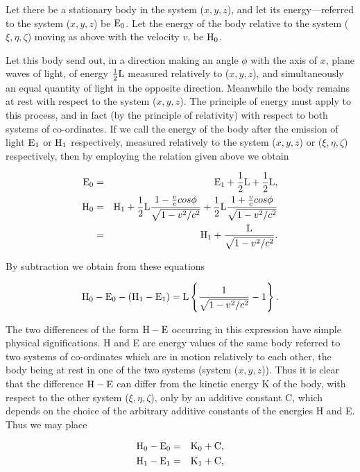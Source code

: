 \documentclass[11pt]{article}
\begin{document}
Let there be a stationary body in the system ($x,y,z$),
and let its energy---referred to the system ($x,y,z$) be ${\rm E}_0$.
Let the energy of the body relative to the system ($\xi,\eta,\zeta$)
moving as above with the velocity $v$, be ${\rm H}_0$.

Let this body send out, in a direction making an angle $\phi$
with the axis of $x$, plane waves of light, of energy
$\frac{1}{2}{\rm L}$ measured relatively to ($x,y,z$), and
simultaneously an equal quantity of light in the opposite
direction.  Meanwhile the body remains at rest with respect to
the system ($x,y,z$).  The principle of energy must apply to
this process, and in fact (by the principle of relativity) with
respect to both systems of co-ordinates.  If we call the energy
of the body after the emission of light ${\rm E}_1$ or
${\rm H}_1$ respectively, measured relatively to the system
($x,y,z$) or ($\xi,\eta,\zeta$) respectively, then by employing
the relation given above we obtain

\begin{eqnarray*}
    {\rm E}_0 & = & {\rm E}_1 + \frac{1}{2}{\rm L} + \frac{1}{2}{\rm L}, \\
    {\rm H}_0 & = & {\rm H}_1 + \frac{1}{2}{\rm L}
        \frac{1-\frac{v}{c}cos\phi}{\sqrt{1-v^2/c^2}}
        + \frac{1}{2}{\rm L} \frac{1+\frac{v}{c}cos\phi}{\sqrt{1-v^2/c^2}} \\
    & = & {\rm H}_1 + \frac{{\rm L}}{\sqrt{1-v^2/c^2}}.
\end{eqnarray*}

\noindent
By subtraction we obtain from these equations

\[ {\rm H}_0 - {\rm E}_0 - ({\rm H}_1 - {\rm E}_1) = {\rm L}\left\{\frac{1}{\sqrt{1-v^2/c^2}}-1\right\}. \]

\noindent
The two differences of the form ${\rm H}-{\rm E}$ occurring in
this expression have simple physical significations.  H and E
are energy values of the same body referred to two systems of
co-ordinates which are in motion relatively to each other, the
body being at rest in one of the two systems (system ($x,y,z$)).
Thus it is clear that the difference ${\rm H}-{\rm E}$ can
differ from the kinetic energy K of the body, with respect to
the other system ($\xi,\eta,\zeta$), only by an additive constant
C, which depends on the choice of the arbitrary additive
constants of the energies H and E\@. Thus we may place

\begin{eqnarray*}
    {\rm H}_0 - {\rm E}_0 & = & {\rm K}_0 + {\rm C},\\
    {\rm H}_1 - {\rm E}_1 & = & {\rm K}_1 + {\rm C},
\end{eqnarray*}
\end{document}
